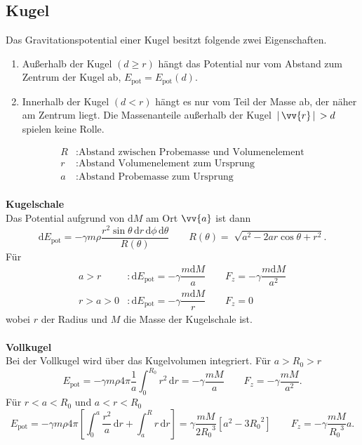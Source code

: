\documentclass[a4paper,12pt]{article}
\newcommand{\td}{\,\text{d}}
\begin{document}
\subsection{Kugel}
Das Gravitationspotential einer Kugel besitzt folgende zwei Eigenschaften.
\begin{enumerate}[label=\arabic*]
        \item Außerhalb der Kugel $\left(d\geq r\right)$ hängt das Potential nur vom Abstand zum Zentrum der Kugel ab, $E_{\text{pot}}=E_{\text{pot}}\left(d\right)$.
        \item Innerhalb der Kugel $\left(d<r\right)$ hängt es nur vom Teil der Masse ab, der näher am Zentrum liegt. Die Massenanteile außerhalb der Kugel $\,|\, \vv{r}\,|\, >d$ spielen keine Rolle.
\end{enumerate}
\begin{align*}
        R&:\text{Abstand zwischen Probemasse und Volumenelement}\\
        r&:\text{Abstand Volumenelement zum Ursprung}\\
        a&:\text{Abstand Probemasse zum Ursprung}
\end{align*}
\hfill\\\textbf{Kugelschale}\\
Das Potential aufgrund von $\text{d}M$ am Ort $\vv{a}$ ist dann
\[ 
        \text{d}E_{\text{pot}}=-\gamma m\rho \dfrac{r^2\sin \theta\, \text{d}r\,\text{d}\phi \,\text{d}\theta }{R\left(\theta \right)}\qquad R\left(\theta \right)=\sqrt[]{a^2-2ar\cos \theta +r^2}
.\] 
Für 
\begin{align*}
        a>r&:\text{d}E_{\text{pot}}=-\gamma \dfrac{m\text{d}M}{a}\qquad F_z=-\gamma \dfrac{m\text{d}M}{a^2}\\
        r>a>0&:\text{d}E_{\text{pot}}=-\gamma \dfrac{m\text{d}M}{r}\qquad F_z=0
\end{align*}
wobei $r$ der Radius und $M$ die Masse der Kugelschale ist.
\\\hfill\\\textbf{Vollkugel}\\ 
Bei der Vollkugel wird über das Kugelvolumen integriert. Für $a>R_0>r$ 
\[ 
        E_{\text{pot}}=-\gamma m\rho 4\pi \dfrac{1}{a}\int_{0}^{R_0}r^2\td r=-\gamma \dfrac{mM}{a}\qquad F_z=-\gamma \dfrac{mM}{a^2}
.\] 
Für $r<a<R_0$ und $a<r<R_0$
\[ 
        E_{\text{pot}}=-\gamma m\rho 4\pi \left[\int_{0}^{a}\dfrac{r^2}{a}\td r+\int_{a}^{R}r\td r\right]=\gamma \dfrac{mM}{2{R_0}^3}\left[a^2-3{R_0}^2\right]\qquad F_z=-\gamma \dfrac{mM}{{R_0}^3}a
.\] 
\end{document}
